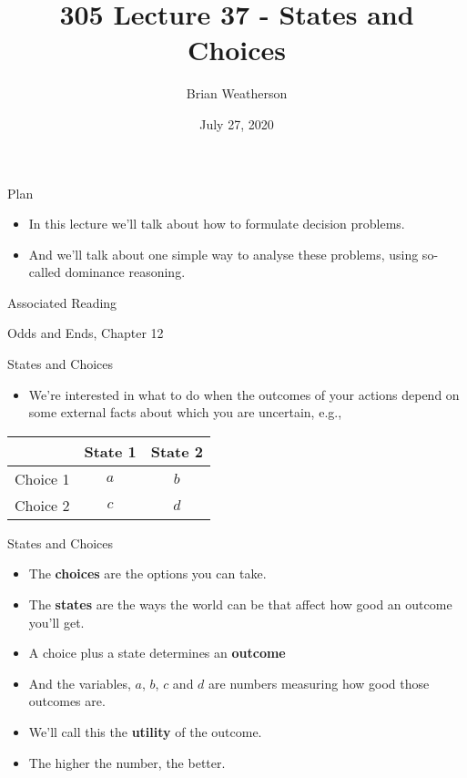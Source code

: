 \documentclass[
  ignorenonframetext,
]{beamer}
\title{305 Lecture 37 - States and Choices}
\author{Brian Weatherson}
\date{July 27, 2020}
\providecommand{\tightlist}{%
  \setlength{\itemsep}{0pt}\setlength{\parskip}{0pt}}
\renewcommand{\,}{\text{, }}
\begin{document}
\frame{\titlepage}

\begin{frame}{Plan}
\protect\hypertarget{plan}{}

\begin{itemize}
\tightlist
\item
  In this lecture we'll talk about how to formulate decision problems.
\item
  And we'll talk about one simple way to analyse these problems, using
  so-called dominance reasoning.
\end{itemize}

\end{frame}

\begin{frame}{Associated Reading}
\protect\hypertarget{associated-reading}{}

Odds and Ends, Chapter 12

\end{frame}

\begin{frame}{States and Choices}
\protect\hypertarget{states-and-choices}{}

\begin{itemize}
\tightlist
\item
  We're interested in what to do when the outcomes of your actions
  depend on some external facts about which you are uncertain, e.g.,
\end{itemize}

\begin{longtable}[]{@{}rcc@{}}
\toprule
& State 1 & State 2\tabularnewline
\midrule
\endhead
Choice 1 & \(a\) & \(b\)\tabularnewline
Choice 2 & \(c\) & \(d\)\tabularnewline
\bottomrule
\end{longtable}

\end{frame}

\begin{frame}{States and Choices}
\protect\hypertarget{states-and-choices-1}{}

\begin{itemize}
\tightlist
\item
  The \textbf{choices} are the options you can take.
\item
  The \textbf{states} are the ways the world can be that affect how good
  an outcome you'll get.
\item
  A choice plus a state determines an \textbf{outcome}
\item
  And the variables, \(a\), \(b\), \(c\) and \(d\) are numbers measuring
  how good those outcomes are.
\item
  We'll call this the \textbf{utility} of the outcome.
\item
  The higher the number, the better.
\end{itemize}

\end{frame}
\end{document}
